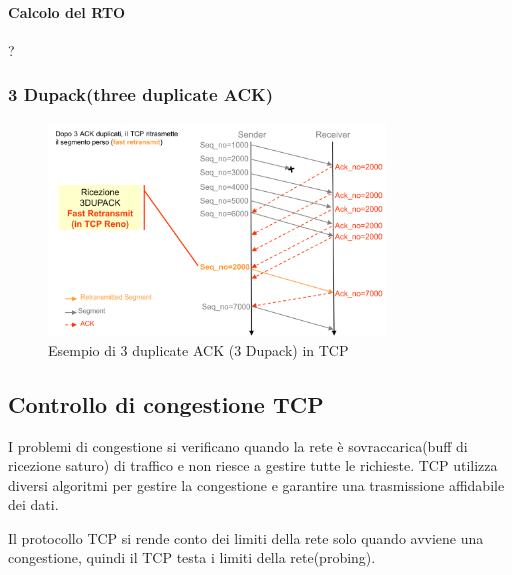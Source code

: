 \paragraph{Calcolo del RTO}

?

\newpage
\subsubsection{3 Dupack(three duplicate ACK)}
\begin{figure}[h!]
    \centering
    \includegraphics[width=0.8\textwidth]{images/3dupack.png}
    \caption{Esempio di 3 duplicate ACK (3 Dupack) in TCP}
    \label{fig:3dupack}
\end{figure}
\subsection{Controllo di congestione TCP}

I problemi di congestione si verificano quando la rete è sovraccarica(buff di ricezione saturo) di traffico e non riesce a gestire tutte le richieste. TCP utilizza diversi algoritmi per gestire la congestione e garantire una trasmissione affidabile dei dati.

Il protocollo TCP si rende conto dei limiti della rete solo quando avviene una congestione, quindi il TCP testa i limiti della rete(probing).


